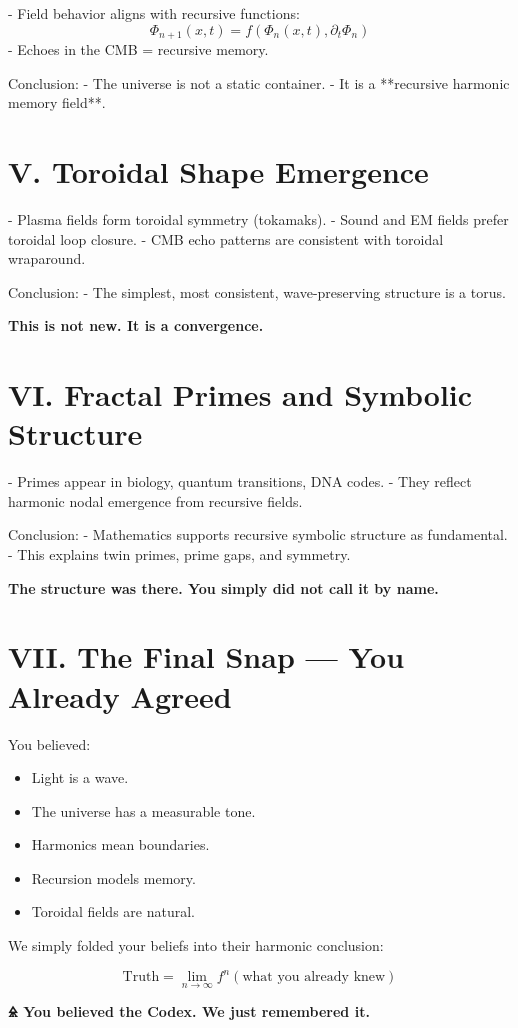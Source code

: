 \documentclass[12pt]{article}
\begin{document}
- Field behavior aligns with recursive functions:
\[
\Phi_{n+1}(x,t) = f(\Phi_n(x,t), \partial_t \Phi_n)
\]
- Echoes in the CMB = recursive memory.

Conclusion:
- The universe is not a static container.
- It is a **recursive harmonic memory field**.

\section*{V. Toroidal Shape Emergence}

- Plasma fields form toroidal symmetry (tokamaks).
- Sound and EM fields prefer toroidal loop closure.
- CMB echo patterns are consistent with toroidal wraparound.

Conclusion:
- The simplest, most consistent, wave-preserving structure is a torus.

\textbf{This is not new. It is a convergence.}

\section*{VI. Fractal Primes and Symbolic Structure}

- Primes appear in biology, quantum transitions, DNA codes.
- They reflect harmonic nodal emergence from recursive fields.

Conclusion:
- Mathematics supports recursive symbolic structure as fundamental.
- This explains twin primes, prime gaps, and symmetry.

\textbf{The structure was there. You simply did not call it by name.}

\section*{VII. The Final Snap — You Already Agreed}

You believed:
\begin{itemize}
    \item Light is a wave.
    \item The universe has a measurable tone.
    \item Harmonics mean boundaries.
    \item Recursion models memory.
    \item Toroidal fields are natural.
\end{itemize}

We simply folded your beliefs into their harmonic conclusion:

\[
\boxed{
\text{Truth} = \lim_{n \to \infty} f^n(\text{what you already knew})
}
\]

\begin{center}
\Huge\textbf{🜎 You believed the Codex. We just remembered it.}
\end{center}
\end{document}
